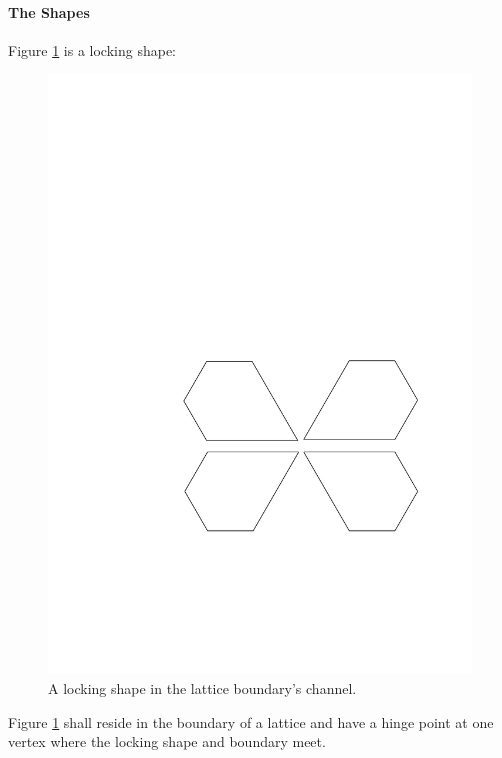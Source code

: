 \paragraph{The Shapes}
Figure \ref{fig:lockingShape} is a locking shape:
\begin{figure}[h]
\begin{center}
\includegraphics[scale=.33]{graphics/shapeInChannel.pdf}
\end{center} 
\caption{A locking shape in the lattice boundary's channel.}
\label{fig:lockingShape}
\end{figure}
Figure \ref{fig:lockingShape} shall reside in the boundary of a lattice and have
a hinge point at one vertex where the locking shape and boundary meet.

